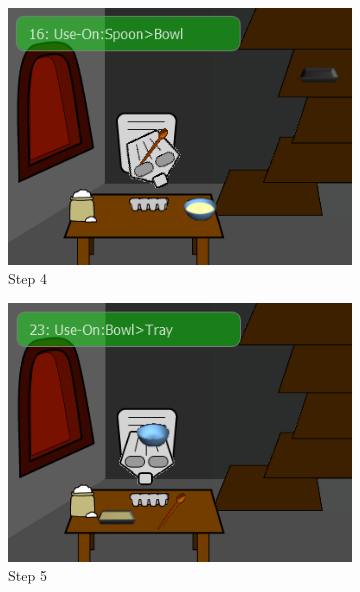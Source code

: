 \begin{figure}[ht]
	
	\centering
	\begin{subfigure}[b]{0.3\textwidth}
		\centering
		\includegraphics[width=\textwidth]{step4.png}
		\caption{Step 4}
		\label{fig:control_batter}
	\end{subfigure}
	\centering
	\begin{subfigure}[b]{0.3\textwidth}
		\centering
		\includegraphics[width=\textwidth]{step5.png}
		\caption{Step 5}
		\label{fig:control_tray}
	\end{subfigure}
	\centering
	\begin{subfigure}[b]{0.3\textwidth}
		\centering

\end{subfigure}
\end{figure}

